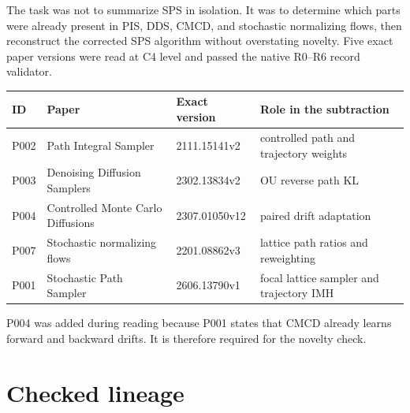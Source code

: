 \documentclass[10pt]{article}
\begin{document}
The task was not to summarize SPS in isolation. It was to determine which
parts were already present in PIS, DDS, CMCD, and stochastic normalizing
flows, then reconstruct the corrected SPS algorithm without overstating
novelty. Five exact paper versions were read at C4 level and passed the
native R0--R6 record validator.

\begin{tabularx}{\linewidth}{@{}P{1.25cm}P{3.5cm}P{2.2cm}Y@{}}
\toprule
ID & Paper & Exact version & Role in the subtraction \\
\midrule
P002 & Path Integral Sampler & 2111.15141v2 & controlled path and trajectory weights \\
P003 & Denoising Diffusion Samplers & 2302.13834v2 & OU reverse path KL \\
P004 & Controlled Monte Carlo Diffusions & 2307.01050v12 & paired drift adaptation \\
P007 & Stochastic normalizing flows & 2201.08862v3 & lattice path ratios and reweighting \\
P001 & Stochastic Path Sampler & 2606.13790v1 & focal lattice sampler and trajectory IMH \\
\bottomrule
\end{tabularx}

P004 was added during reading because P001 states that CMCD already learns
forward and backward drifts. It is therefore required for the novelty check.

\section{Checked lineage}
\end{document}
